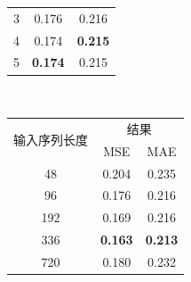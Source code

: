 \documentclass[twoside,12pt]{article}
\begin{document}
\begin{table}[htbp]
\begin{tabular}{c|cc}
    3                            & 0.176                                        & 0.216          \\
    4                            & 0.174                                        & \textbf{0.215} \\
    5                            & \textbf{0.174}                               & 0.215          \\
    \bottomrule
  \end{tabular}
  \\
  \vspace{5pt}
  \centering
  \begin{tabular}{c|cc}
    \toprule
    \multirow{2}{*}{输入序列长度} & \multicolumn{2}{c}{结果}                  \\
    \cmidrule(lr){2-3}
                                  & MSE                      & MAE            \\
    \midrule
    48                            & 0.204                    & 0.235          \\
    96                            & 0.176                    & 0.216          \\
    192                           & 0.169                    & 0.216          \\
    336                           & \textbf{0.163}           & \textbf{0.213} \\
    720                           & 0.180                    & 0.232          \\
    \bottomrule
  \end{tabular}
\end{table}
\end{document}
